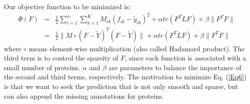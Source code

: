 \documentclass{llncs} %
\begin{document}
Our objective function to be minimized is:
\begin{eqnarray}
  \Phi(F)&=&\frac{1}{2} \sum_{i=1}^n \sum_{k=1}^{K}  M_{ik}(f_{ik}-\tilde{y}_{ik})^2 +\alpha tr(F^{T}LF)+ \beta \|F^{T}F\|\nonumber\\
  &=&\frac{1}{2} \|M\circ(F-\tilde{Y})^{T}(F-\tilde{Y})\|  +\alpha tr(F^{T}LF)+ \beta \|F^{T}F\|
  \label{Eq6}
\end{eqnarray}
where $\circ$ means element-wise multiplication (also called Hadamard product). The third term is to control the sparsity of $F$, since each function is associated with a small number of proteins. $\alpha$ and $\beta$ are parameters to balance the importance of the second and third terms, respectively. The motivation to minimize Eq. (\ref{Eq6}) is that we want to seek the prediction that is not only smooth and sparse, but can also append the missing annotations for proteins.
\end{document}
